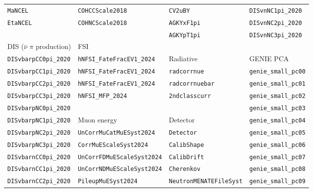\documentclass{article}
\begin{document}
\begin{table}[hbt]
{\begin{tabular}{llll}
\texttt{MaNCEL}                    & \texttt{COHCCScale2018}            & \texttt{CV2uBY}                        & \texttt{DISvnNC1pi\_2020} \\
\texttt{EtaNCEL}                   & \texttt{COHNCScale2018}            & \texttt{AGKYxF1pi}                     & \texttt{DISvnNC2pi\_2020} \\
                                   &                                    & \texttt{AGKYpT1pi}                     & \texttt{DISvnNC3pi\_2020} \\
DIS ($\bar{\nu}$ $\pi$ production) & FSI                                &                                        & \\
\texttt{DISvbarpCC0pi\_2020}       & \texttt{hNFSI\_FateFracEV1\_2024}  & Radiative                              & GENIE PCA \\
\texttt{DISvbarpCC1pi\_2020}       & \texttt{hNFSI\_FateFracEV1\_2024}  & \texttt{radcorrnue}                    & \texttt{genie\_small\_pc00} \\
\texttt{DISvbarpCC2pi\_2020}       & \texttt{hNFSI\_FateFracEV1\_2024}  & \texttt{radcorrnuebar}                 & \texttt{genie\_small\_pc01} \\
\texttt{DISvbarpCC3pi\_2020}       & \texttt{hNFSI\_MFP\_2024}          & \texttt{2ndclasscurr}                  & \texttt{genie\_small\_pc02} \\
\texttt{DISvbarpNC0pi\_2020}       &                                    &                                        & \texttt{genie\_small\_pc03} \\
\texttt{DISvbarpNC1pi\_2020}       & Muon energy                        & Detector                               & \texttt{genie\_small\_pc04} \\
\texttt{DISvbarpNC2pi\_2020}       & \texttt{UnCorrMuCatMuESyst2024}    & \texttt{Detector}                      & \texttt{genie\_small\_pc05} \\
\texttt{DISvbarpNC3pi\_2020}       & \texttt{CorrMuEScaleSyst2024}      & \texttt{CalibShape}                    & \texttt{genie\_small\_pc06} \\
\texttt{DISvbarnCC0pi\_2020}       & \texttt{UnCorrFDMuEScaleSyst2024}  & \texttt{CalibDrift}                    & \texttt{genie\_small\_pc07} \\
\texttt{DISvbarnCC1pi\_2020}       & \texttt{UnCorrNDMuEScaleSyst2024}  & \texttt{Cherenkov}                     & \texttt{genie\_small\_pc08} \\
\texttt{DISvbarnCC2pi\_2020}       & \texttt{PileupMuESyst2024}         & \texttt{NeutronMENATEFileSyst}         & \texttt{genie\_small\_pc09} \\

\end{tabular}}
\end{table}
\end{document}
